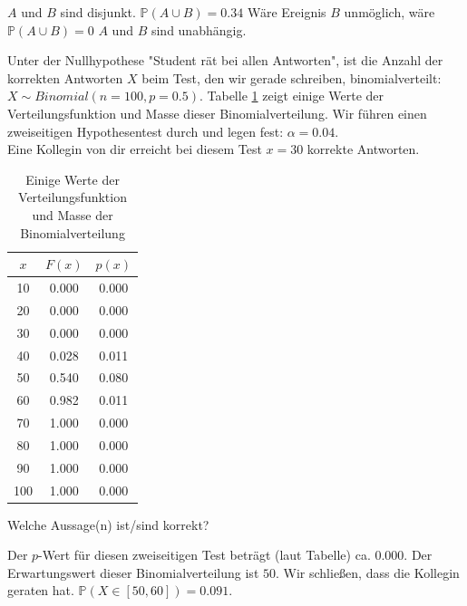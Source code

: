 \documentclass[10pt,addpoints]{exam}
\begin{document}
\begin{questions}
\begin{choices}
\choice $A$ und $B$ sind disjunkt.
\choice $\mathbb{P}(A \cup B) = 0.34$
\choice Wäre Ereignis $B$ unmöglich, wäre $\mathbb{P}(A \cup B) = 0$
\choice $A$ und $B$ sind unabhängig.
\end{choices}

\question Unter der Nullhypothese "Student rät bei allen Antworten", ist die Anzahl der korrekten Antworten $X$
beim Test, den wir gerade schreiben, binomialverteilt: $X \sim Binomial(n=100, p=0.5)$.
Tabelle \ref{tab:binomialwerte} zeigt einige Werte der
Verteilungsfunktion und Masse dieser Binomialverteilung. 
Wir führen einen zweiseitigen Hypothesentest durch und legen fest: $\alpha = 0.04$.\\
Eine Kollegin von dir erreicht bei diesem Test $x=30$ korrekte Antworten.
\\
\begin{table}[h!]
    \centering
    \caption{Einige Werte der Verteilungsfunktion und Masse der Binomialverteilung}
    \label{tab:binomialwerte}
    \begin{tabular}{|c|c|c|}
    \hline
    $x$ & $F(x)$ & $p(x)$ \\
    \hline
    10  & 0.000 & 0.000 \\
    20  & 0.000 & 0.000 \\
    30  & 0.000 & 0.000 \\
    40  & 0.028 & 0.011 \\
    50  & 0.540 & 0.080 \\
    60  & 0.982 & 0.011 \\
    70  & 1.000 & 0.000 \\
    80  & 1.000 & 0.000 \\
    90  & 1.000 & 0.000 \\
    100 & 1.000 & 0.000 \\
    \hline
    \end{tabular}
    \end{table}

Welche Aussage(n) ist/sind korrekt?
\\
\begin{choices}
\CorrectChoice Der $p$-Wert für diesen zweiseitigen Test beträgt (laut Tabelle) ca. $0.000$.
\CorrectChoice Der Erwartungswert dieser Binomialverteilung ist $50$.
\choice Wir schließen, dass die Kollegin geraten hat.
\choice $\mathbb{P}(X \in [50, 60]) = 0.091$.
\end{choices}


\end{questions}
\end{document}
